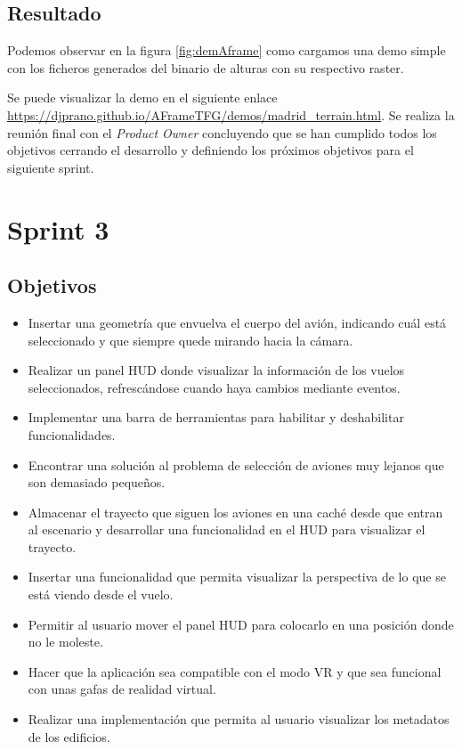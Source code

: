 \documentclass[a4paper, 11pt]{book}
\begin{document}
\subsection{Resultado}
Podemos observar en la figura \ref{fig:demAframe} como cargamos una demo simple con los ficheros generados del binario de alturas con su respectivo raster. 

Se puede visualizar la demo en el siguiente enlace \url{https://djprano.github.io/AFrameTFG/demos/madrid_terrain.html}.
Se realiza la reunión final con el \emph{Product Owner} concluyendo que se han cumplido todos los objetivos cerrando el desarrollo y definiendo los próximos objetivos para el siguiente sprint.
\section{Sprint 3}
\subsection{Objetivos}
\begin{itemize}
    \item Insertar una geometría que envuelva el cuerpo del avión, indicando cuál está seleccionado y que siempre quede mirando hacia la cámara.
    \item Realizar un panel \textsc{HUD} donde visualizar la información de los vuelos seleccionados, refrescándose cuando haya cambios mediante eventos.
    \item Implementar una barra de herramientas para habilitar y deshabilitar funcionalidades.
    \item Encontrar una solución al problema de selección de aviones muy lejanos que son demasiado pequeños.
    \item Almacenar el trayecto que siguen los aviones en una caché desde que entran al escenario y desarrollar una funcionalidad en el \textsc{HUD} para visualizar el trayecto.
    \item Insertar una funcionalidad que permita visualizar la perspectiva de lo que se está viendo desde el vuelo.
    \item Permitir al usuario mover el panel \textsc{HUD} para colocarlo en una posición donde no le moleste.
    \item Hacer que la aplicación sea compatible con el modo VR y que sea funcional con unas gafas de realidad virtual.
    \item Realizar una implementación que permita al usuario visualizar los metadatos de los edificios.
\end{itemize}
\end{document}
